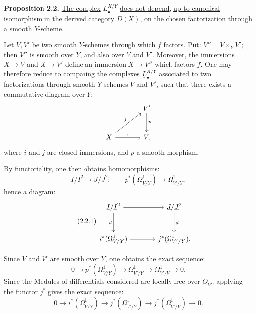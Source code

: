 %
\textbf{Proposition 2.2.} \uline{The complex} $\underline{L}^{X/Y}_\bullet$ \uline{does not depend}, \uline{up to canonical isomorphism in the derived category} $D(X)$, \uline{on the chosen factorization through a smooth} $Y$-\uline{scheme}.

Let $V,V'$ be two smooth $Y$-schemes through which $f$ factors. Put: $V''=V\times_Y V'$; then $V''$ is smooth over $Y$, and also over $V$ and $V'$. Moreover, the immersions $X\to V$ and $X\to V'$ define an immersion $X\to V''$ which factors $f$. One may therefore reduce to comparing the complexes $\underline{L}^{X/Y}_\bullet$ associated to two factorizations through smooth $Y$-schemes $V$ and $V'$, such that there exists a commutative diagram over $Y$:
\[
\begin{tikzcd}[column sep=large,row sep=large]
& V' \arrow[d,"p"]\\
X \arrow[ur,"j"] \arrow[r,"i"] & V,
\end{tikzcd}
\]
where $i$ and $j$ are closed immersions, and $p$ a smooth morphism.

By functoriality, one then obtains homomorphisms:
\[
\underline{I}/\underline{I}^2\longrightarrow \underline{J}/\underline{J}^2;
\qquad
p^*(\underline{\Omega}^1_{V/Y})\longrightarrow\underline{\Omega}^1_{V'/Y},
\]
hence a diagram:
\begin{equation}\tag{2.2.1}
\begin{tikzcd}[column sep=large,row sep=large]
\underline{I}/\underline{I}^2 \arrow[r] \arrow[d,"d"'] & \underline{J}/\underline{J}^2 \arrow[d,"d"]\\
i^*(\underline{\Omega}^1_{V/Y}) \arrow[r] & j^*(\underline{\Omega}^1_{V'/Y}).
\end{tikzcd}
\end{equation}

Since $V$ and $V'$ are smooth over $Y$, one obtains the exact sequence:
\[
0\longrightarrow p^*(\underline{\Omega}^1_{V/Y})\longrightarrow\underline{\Omega}^1_{V'/Y}
\longrightarrow\underline{\Omega}^1_{V'/V}\longrightarrow0.
\]
Since the Modules of differentials considered are locally free over $\underline{O}_{V'}$, applying the functor $j^*$ gives the exact sequence:
\begin{equation}\tag{2.2.2}
0\longrightarrow i^*(\underline{\Omega}^1_{V/Y})\longrightarrow j^*(\underline{\Omega}^1_{V'/Y})
\longrightarrow j^*(\underline{\Omega}^1_{V'/V})\longrightarrow0.
\end{equation}

